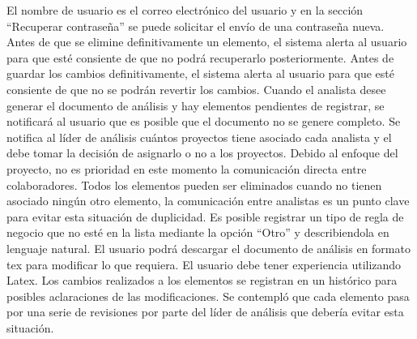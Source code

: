 \clearpage
\begin{riesgos}
		{El nombre de usuario es el correo electrónico del usuario y en la sección ``Recuperar contraseña'' se puede solicitar el envío de una contraseña nueva.}
		{Antes de que se elimine definitivamente un elemento, el sistema alerta al usuario para que esté consiente de que no podrá recuperarlo posteriormente.}
		{Antes de guardar los cambios definitivamente, el sistema alerta al usuario para que esté consiente de que no se podrán revertir los cambios.}
		{Cuando el analista desee generar el documento de análisis y hay elementos pendientes de registrar, se notificará al usuario que es posible que el documento 
		no se genere completo.}
		{Se notifica al líder de análisis cuántos proyectos tiene asociado cada analista y el debe tomar la decisión de asignarlo o no a los proyectos.}
		{Debido al enfoque del proyecto, no es prioridad en este momento la comunicación directa entre colaboradores.}
 		{Todos los elementos pueden ser eliminados cuando no tienen asociado ningún otro elemento, la comunicación entre analistas es un punto clave para evitar esta situación de duplicidad.}
 		{Es posible registrar un tipo de regla de negocio que no esté en la lista mediante la opción ``Otro'' y describiendola en lenguaje natural.}
 		{El usuario podrá descargar el documento de análisis en formato tex para modificar lo que requiera. El usuario debe tener experiencia utilizando Latex.}
		{Los cambios realizados a los elementos se registran en un histórico para posibles aclaraciones de las modificaciones.}
		{Se contempló que cada elemento pasa por una serie de revisiones por parte del líder de análisis que debería evitar esta situación.}
\end{riesgos}



